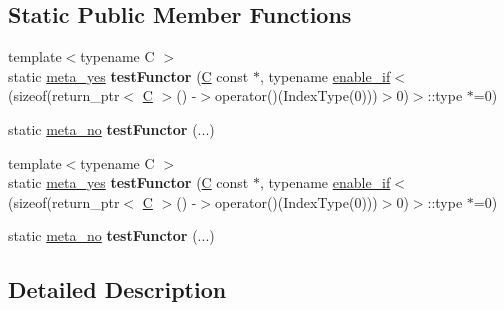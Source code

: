\subsection*{Static Public Member Functions}
\begin{DoxyCompactItemize}
\item 
\mbox{\label{struct_eigen_1_1internal_1_1has__unary__operator_aa954cf07979feb0991fbc745de948edd}} 
{\footnotesize template$<$typename C $>$ }\\static \hyperlink{struct_eigen_1_1internal_1_1meta__yes}{meta\+\_\+yes} {\bfseries test\+Functor} (\hyperlink{group___core___module}{C} const $\ast$, typename \hyperlink{struct_eigen_1_1internal_1_1enable__if}{enable\+\_\+if}$<$(sizeof(return\+\_\+ptr$<$ \hyperlink{group___core___module}{C} $>$() -\/$>$operator()(Index\+Type(0)))$>$0)$>$\+::type $\ast$=0)
\item 
\mbox{\label{struct_eigen_1_1internal_1_1has__unary__operator_aa4170dd8818e2f8a1fc3e075ccadd7b7}} 
static \hyperlink{struct_eigen_1_1internal_1_1meta__no}{meta\+\_\+no} {\bfseries test\+Functor} (...)
\item 
\mbox{\label{struct_eigen_1_1internal_1_1has__unary__operator_aa954cf07979feb0991fbc745de948edd}} 
{\footnotesize template$<$typename C $>$ }\\static \hyperlink{struct_eigen_1_1internal_1_1meta__yes}{meta\+\_\+yes} {\bfseries test\+Functor} (\hyperlink{group___core___module}{C} const $\ast$, typename \hyperlink{struct_eigen_1_1internal_1_1enable__if}{enable\+\_\+if}$<$(sizeof(return\+\_\+ptr$<$ \hyperlink{group___core___module}{C} $>$() -\/$>$operator()(Index\+Type(0)))$>$0)$>$\+::type $\ast$=0)
\item 
\mbox{\label{struct_eigen_1_1internal_1_1has__unary__operator_aa4170dd8818e2f8a1fc3e075ccadd7b7}} 
static \hyperlink{struct_eigen_1_1internal_1_1meta__no}{meta\+\_\+no} {\bfseries test\+Functor} (...)
\end{DoxyCompactItemize}


\subsection{Detailed Description}
